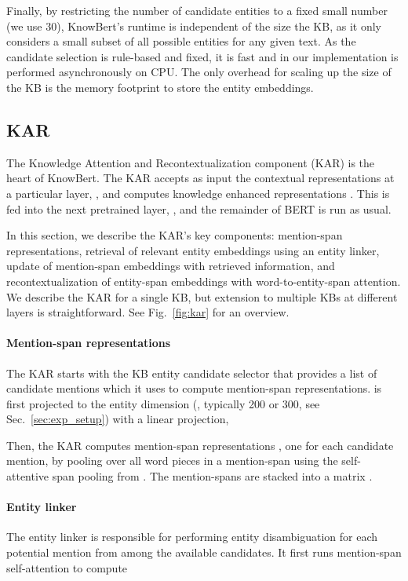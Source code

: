 \documentclass[11pt,a4paper]{article}
\newcommand{\KB}[0]{KnowBert}
\begin{document}
Finally, by restricting the number of candidate entities to a fixed small number (we use 30), \KB's runtime is independent of the size the KB, as it only considers a small subset of all possible entities for any given text.
As the candidate selection is rule-based and fixed, it is fast and in our implementation is performed asynchronously on CPU.
The only overhead for scaling up the size of the KB is the memory footprint to store the entity embeddings.

\subsection{KAR}


The Knowledge Attention and Recontextualization component (KAR) is the heart of \KB.
The KAR accepts as input the contextual representations at a particular layer, , and computes knowledge enhanced representations .
This is fed into the next pretrained layer, , and the remainder of BERT is run as usual.

In this section, we describe the KAR's key components: mention-span representations, retrieval of relevant entity embeddings using an entity linker, update of mention-span embeddings with retrieved information, and recontextualization of entity-span embeddings with word-to-entity-span attention.
We describe the KAR for a single KB, but extension to multiple KBs at different layers is straightforward.  
See Fig.~\ref{fig:kar} for an overview.

\paragraph{Mention-span representations}  The KAR starts with the KB entity candidate selector that provides a list of candidate mentions which it uses to compute mention-span representations.
 is first projected to the entity dimension (, typically 200 or 300, see Sec.~\ref{sec:exp_setup}) with a linear projection,

Then, the KAR computes  mention-span representations , one for each candidate mention, by pooling over all word pieces in a mention-span using the self-attentive span pooling from \citet{Lee2017EndtoendNC}.
The mention-spans are stacked into a matrix .

\paragraph{Entity linker}
The entity linker is responsible for performing entity disambiguation for each potential mention from among the available candidates.
It first runs mention-span self-attention to compute
\end{document}
